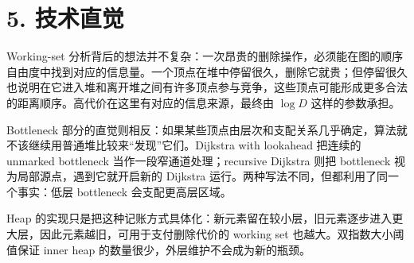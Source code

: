 \section*{5. 技术直觉}
Working-set 分析背后的想法并不复杂：一次昂贵的删除操作，必须能在图的顺序自由度中找到对应的信息量。一个顶点在堆中停留很久，删除它就贵；但停留很久也说明在它进入堆和离开堆之间有许多顶点参与竞争，这些顶点可能形成更多合法的距离顺序。高代价在这里有对应的信息来源，最终由 \(\log D\) 这样的参数承担。

Bottleneck 部分的直觉则相反：如果某些顶点由层次和支配关系几乎确定，算法就不该继续用普通堆比较来“发现”它们。Dijkstra with lookahead 把连续的 unmarked bottleneck 当作一段窄通道处理；recursive Dijkstra 则把 bottleneck 视为局部源点，遇到它就开启新的 Dijkstra 运行。两种写法不同，但都利用了同一个事实：低层 bottleneck 会支配更高层区域。

Heap 的实现只是把这种记账方式具体化：新元素留在较小层，旧元素逐步进入更大层，因此元素越旧，可用于支付删除代价的 working set 也越大。双指数大小阈值保证 inner heap 的数量很少，外层维护不会成为新的瓶颈。
